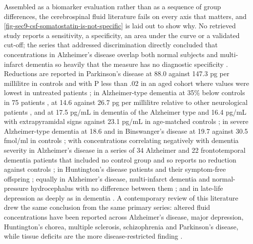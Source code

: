 \documentclass[11pt]{article}
\begin{document}
Assembled as a biomarker evaluation rather than as a sequence of group differences, the cerebrospinal fluid literature fails on every axis that matters, and \ref{fig-sec9-csf-somatostatin-is-not-specific} is laid out to show why. No retrieved study reports a sensitivity, a specificity, an area under the curve or a validated cut-off; the series that addressed discrimination directly concluded that concentrations in Alzheimer's disease overlap both normal subjects and multi-infarct dementia so heavily that the measure has no diagnostic specificity \citep{Beal1986e}. Reductions are reported in Parkinson's disease at 88.0 against 147.3 pg per millilitre in controls \citep{Dupont1982} and with P less than .02 in an aged cohort where values were lowest in untreated patients \citep{Masson1990}; in Alzheimer-type dementia at 35\% below controls in 75 patients \citep{Reinikainen1987}, at 14.6 against 26.7 pg per millilitre relative to other neurological patients \citep{Serby1984}, and at 17.5 pg/mL in dementia of the Alzheimer type and 16.4 pg/mL with extrapyramidal signs against 23.1 pg/mL in age-matched controls \citep{Atack1988}; in severe Alzheimer-type dementia at 18.6 and in Binswanger's disease at 19.7 against 30.5 fmol/ml in controls \citep{Strittmatter1996b}; with concentrations correlating negatively with dementia severity in Alzheimer's disease in a series of 34 Alzheimer and 22 frontotemporal dementia patients that included no control group and so reports no reduction against controls \citep{Minthon1997}; in Huntington's disease patients and their symptom-free offspring \citep{Cramer1981}; equally in Alzheimer's disease, multi-infarct dementia and normal-pressure hydrocephalus with no difference between them \citep{Molins1991}; and in late-life depression as deeply as in dementia \citep{Sunderland1987}. A contemporary review of this literature drew the same conclusion from the same primary series: altered fluid concentrations have been reported across Alzheimer's disease, major depression, Huntington's chorea, multiple sclerosis, schizophrenia and Parkinson's disease, while tissue deficits are the more disease-restricted finding \citep{Bissette1992}.
\end{document}

